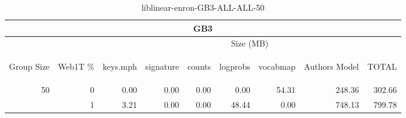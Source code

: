 \begin{center}
\begin{table}[htbp]
\begin{tabular}{ | r | r | r | r | r | r | r | r | r |}
\hline
\multicolumn{9}{|c|}{GB3}\\
\hline
 & & \multicolumn{7}{|c|}{Size (MB)}\\ \cline{3-9}
\begin{sideways}Group Size\end{sideways} & \begin{sideways}Web1T \% \end{sideways} & \begin{sideways}keys.mph\end{sideways} & \begin{sideways}signature\end{sideways} & \begin{sideways}counts\end{sideways} & \begin{sideways}logprobs\end{sideways} & \begin{sideways}vocabmap\end{sideways} & \begin{sideways}Authors Model \end{sideways} & \begin{sideways}TOTAL\end{sideways}\\
\hline
\multirow{1}{*}{50}
 & 0 & 0.00 & 0.00 & 0.00 & 0.00 & 54.31 & 248.36 & 302.66\\ \cline{2-9}
 & 1 & 3.21 & 0.00 & 0.00 & 48.44 & 0.00 & 748.13 & 799.78\\ \cline{2-9}
\hline
\end{tabular}
\caption{liblinear-enron-GB3-ALL-ALL-50}
\label{table:liblinear-enron-GB3-ALL-ALL-50}
\end{table}
\end{center}

